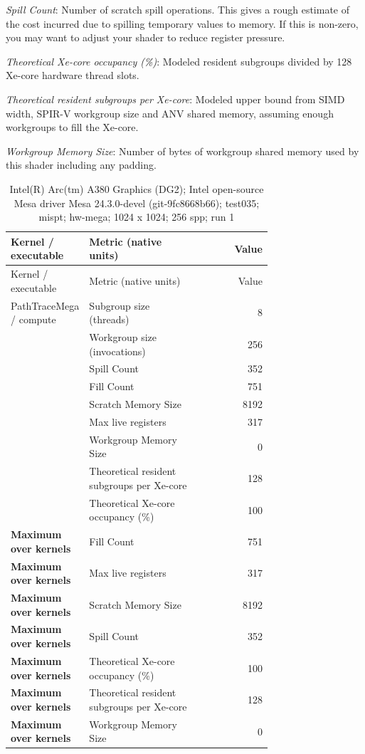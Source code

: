 \noindent\textit{Spill Count}: Number of scratch spill operations.  This gives a rough estimate of the cost incurred due to spilling temporary values to memory.  If this is non-zero, you may want to adjust your shader to reduce register pressure.\par
\noindent\textit{Theoretical Xe-core occupancy (\%)}: Modeled resident subgroups divided by 128 Xe-core hardware thread slots.\par
\noindent\textit{Theoretical resident subgroups per Xe-core}: Modeled upper bound from SIMD width, SPIR-V workgroup size and ANV shared memory, assuming enough workgroups to fill the Xe-core.\par
\noindent\textit{Workgroup Memory Size}: Number of bytes of workgroup shared memory used by this shader including any padding.\par
\begin{longtable}{p{0.30\linewidth}p{0.43\linewidth}r}
\caption{Intel(R) Arc(tm) A380 Graphics (DG2); Intel open-source Mesa driver Mesa 24.3.0-devel (git-9fc8668b66); test035; mispt; hw-mega; 1024 x 1024; 256 spp; run 1}\label{tab:hydra-profile-1}\\
\hline Kernel / executable & Metric (native units) & Value \\\hline
\endfirsthead
\hline Kernel / executable & Metric (native units) & Value \\\hline
\endhead
PathTraceMega / compute & Subgroup size (threads) & 8 \\
 & Workgroup size (invocations) & 256 \\
 & Spill Count & 352 \\
 & Fill Count & 751 \\
 & Scratch Memory Size & 8192 \\
 & Max live registers & 317 \\
 & Workgroup Memory Size & 0 \\
 & Theoretical resident subgroups per Xe-core & 128 \\
 & Theoretical Xe-core occupancy (\%) & 100 \\
\hline
\textbf{Maximum over kernels} & Fill Count & 751 \\
\textbf{Maximum over kernels} & Max live registers & 317 \\
\textbf{Maximum over kernels} & Scratch Memory Size & 8192 \\
\textbf{Maximum over kernels} & Spill Count & 352 \\
\textbf{Maximum over kernels} & Theoretical Xe-core occupancy (\%) & 100 \\
\textbf{Maximum over kernels} & Theoretical resident subgroups per Xe-core & 128 \\
\textbf{Maximum over kernels} & Workgroup Memory Size & 0 \\
\hline
\end{longtable}

